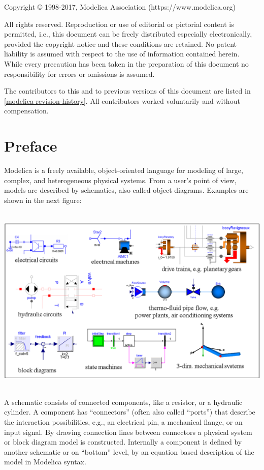 \documentclass[10pt,a4paper]{report}
\begin{document}
\hypersetup{pageanchor=true}
Copyright © 1998-2017, Modelica Association (https://www.modelica.org)

All rights reserved. Reproduction or use of editorial or pictorial
content is permitted, i.e., this document can be freely distributed
especially electronically, provided the copyright notice and these
conditions are retained. No patent liability is assumed with respect to
the use of information contained herein. While every precaution has been
taken in the preparation of this document no responsibility for errors
or omissions is assumed.

The contributors to this and to previous versions of this document are
listed in \ref{modelica-revision-history}. All contributors worked voluntarily and without
compensation.

\tableofcontents

\chapter*{Preface}
Modelica is a freely available, object-oriented language for modeling of
large, complex, and heterogeneous physical systems. From a user's point
of view, models are described by schematics, also called object
diagrams. Examples are shown in the next figure:

\includegraphics[width=5.92986in,height=3.59167in]{media/image2.png}

A schematic consists of connected components, like a resistor, or a
hydraulic cylinder. A component has ``connectors'' (often also called
``ports'') that describe the interaction possibilities, e.g., an
electrical pin, a mechanical flange, or an input signal. By drawing
connection lines between connectors a physical system or block diagram
model is constructed. Internally a component is defined by another
schematic or on ``bottom'' level, by an equation based description of
the model in Modelica syntax.
\end{document}
